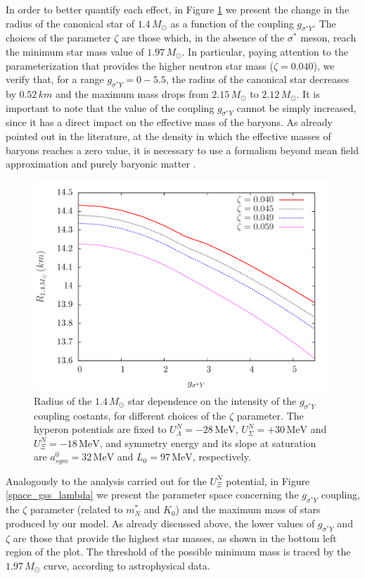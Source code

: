 \documentclass[twocolumn,showpacs,aps]{revtex4}
\begin{document}
In order to better quantify each effect, in Figure \ref{radius_gss} 
we present the change in the radius of the canonical star of $1.4\,M_{\odot}$ as a function 
of the coupling $g_{\sigma^* Y}$. The choices of the parameter $\zeta$ are those which, in the 
absence of the $\sigma^*$ meson, reach the minimum star mass value of $1.97\,M_{\odot}$.
In particular, paying attention to the parameterization that provides the higher neutron star mass ($\zeta=0.040$),
we verify that, for a range $g_{\sigma^* Y}=0-5.5$, the radius of the canonical star decreases by $0.52\,km$ and 
the maximum mass drops from $2.15\,M_{\odot}$ to $2.12\,M_{\odot}$.
It is important to note that the value of the coupling $g_{\sigma^* Y}$ cannot be simply increased, since it 
has a direct impact on the effective mass of the baryons. 
As already pointed out in the literature, at the density in which the effective masses of baryons reaches a zero value, 
it is necessary to use a formalism beyond mean field approximation and purely baryonic matter \cite{Schaffner:1995th,Taurines:2000zb}.

  \begin{figure}
\centering
\vspace{1.0cm}
 \includegraphics[width=9.cm]{radius14_paper_gss.png}
    \caption{Radius of the $1.4\, M_{\odot}$ star dependence on the intensity of the $g_{\sigma^* Y}$ coupling costants, for different choices of the $\zeta$ parameter. 
 The hyperon potentials are fixed to $U_{\Lambda}^N=-28 \,\mathrm{MeV}$, $U_{\Sigma}^N=+30 \,\mathrm{MeV}$ and $U_{\Xi}^N=-18 \,\mathrm{MeV}$, and symmetry energy and its slope 
 at saturation are $a_{sym}^0= 32 \,\mathrm{MeV}$ and $L_0=97\,\mathrm{MeV}$, respectively.} \label{radius_gss} 
 \end{figure}
  

Analogously to the analysis carried out for the $U_{\Xi}^N$ potential, in Figure \ref{space_gss_lambda}
we present the parameter space concerning the $g_{\sigma^* Y}$ coupling, the $\zeta$ parameter 
(related to $m^*_N$ and $K_0$)
and the maximum mass of stars produced by our model.
As already discussed above, the lower values of $g_{\sigma^* Y}$ and $\zeta$ are those that provide the
highest star masses, as shown in the bottom left region of the plot. 
The threshold of the possible minimum mass is traced by the $1.97\,M_{\odot}$ curve, according to astrophysical data.
  
\end{document}
